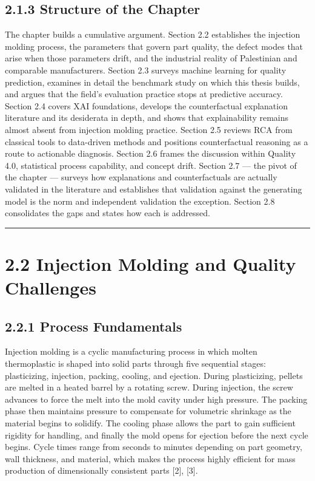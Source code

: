 \hypertarget{structure-of-the-chapter}{%
\subsection{2.1.3 Structure of the Chapter}\label{structure-of-the-chapter}}

The chapter builds a cumulative argument. Section 2.2 establishes the injection molding process, the parameters that govern part quality, the defect modes that arise when those parameters drift, and the industrial reality of Palestinian and comparable manufacturers. Section 2.3 surveys machine learning for quality prediction, examines in detail the benchmark study on which this thesis builds, and argues that the field's evaluation practice stops at predictive accuracy. Section 2.4 covers XAI foundations, develops the counterfactual explanation literature and its desiderata in depth, and shows that explainability remains almost absent from injection molding practice. Section 2.5 reviews RCA from classical tools to data-driven methods and positions counterfactual reasoning as a route to actionable diagnosis. Section 2.6 frames the discussion within Quality 4.0, statistical process capability, and concept drift. Section 2.7 --- the pivot of the chapter --- surveys how explanations and counterfactuals are actually validated in the literature and establishes that validation against the generating model is the norm and independent validation the exception. Section 2.8 consolidates the gaps and states how each is addressed.

\begin{center}\rule{0.5\linewidth}{0.5pt}\end{center}

\hypertarget{injection-molding-and-quality-challenges}{%
\section{2.2 Injection Molding and Quality Challenges}\label{injection-molding-and-quality-challenges}}

\hypertarget{process-fundamentals}{%
\subsection{2.2.1 Process Fundamentals}\label{process-fundamentals}}

Injection molding is a cyclic manufacturing process in which molten thermoplastic is shaped into solid parts through five sequential stages: plasticizing, injection, packing, cooling, and ejection. During plasticizing, pellets are melted in a heated barrel by a rotating screw. During injection, the screw advances to force the melt into the mold cavity under high pressure. The packing phase then maintains pressure to compensate for volumetric shrinkage as the material begins to solidify. The cooling phase allows the part to gain sufficient rigidity for handling, and finally the mold opens for ejection before the next cycle begins. Cycle times range from seconds to minutes depending on part geometry, wall thickness, and material, which makes the process highly efficient for mass production of dimensionally consistent parts {[}2{]}, {[}3{]}.

